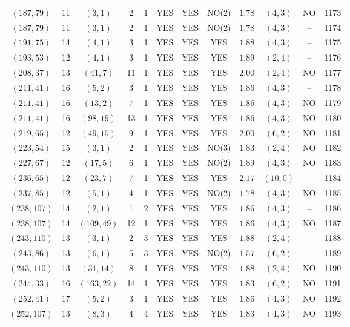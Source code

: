 \begin{longtable}{|c|c|c|c|c|c|c|c|c|c|c|c|}
$(187,79)$ & 11 & $(3,1)$ & 2 & 1 & YES & YES & NO(2) & $1.78$ & $(4,3)$ & NO & 1173\\
$(187,79)$ & 11 & $(3,1)$ & 2 & 1 & YES & YES & NO(2) & $1.78$ & $(4,3)$ & -- & 1174\\
$(191,75)$ & 14 & $(4,1)$ & 3 & 1 & YES & YES & YES & $1.88$ & $(4,3)$ & -- & 1175\\
$(193,53)$ & 12 & $(4,1)$ & 3 & 1 & YES & YES & YES & $1.89$ & $(2,4)$ & -- & 1176\\
$(208,37)$ & 13 & $(41,7)$ & 11 & 1 & YES & YES & YES & $2.00$ & $(2,4)$ & NO & 1177\\
$(211,41)$ & 16 & $(5,2)$ & 3 & 1 & YES & YES & YES & $1.86$ & $(4,3)$ & -- & 1178\\
$(211,41)$ & 16 & $(13,2)$ & 7 & 1 & YES & YES & YES & $1.86$ & $(4,3)$ & NO & 1179\\
$(211,41)$ & 16 & $(98,19)$ & 13 & 1 & YES & YES & YES & $1.86$ & $(4,3)$ & NO & 1180\\
$(219,65)$ & 12 & $(49,15)$ & 9 & 1 & YES & YES & YES & $2.00$ & $(6,2)$ & NO & 1181\\
$(223,54)$ & 15 & $(3,1)$ & 2 & 1 & YES & YES & NO(3) & $1.83$ & $(2,4)$ & NO & 1182\\
$(227,67)$ & 12 & $(17,5)$ & 6 & 1 & YES & YES & NO(2) & $1.89$ & $(4,3)$ & NO & 1183\\
$(236,65)$ & 12 & $(23,7)$ & 7 & 1 & YES & YES & YES & $2.17$ & $(10,0)$ & -- & 1184\\
$(237,85)$ & 12 & $(5,1)$ & 4 & 1 & YES & YES & NO(2) & $1.78$ & $(4,3)$ & NO & 1185\\
$(238,107)$ & 14 & $(2,1)$ & 1 & 2 & YES & YES & YES & $1.86$ & $(4,3)$ & -- & 1186\\
$(238,107)$ & 14 & $(109,49)$ & 12 & 1 & YES & YES & YES & $1.86$ & $(4,3)$ & NO & 1187\\
$(243,110)$ & 13 & $(3,1)$ & 2 & 3 & YES & YES & YES & $1.88$ & $(2,4)$ & -- & 1188\\
$(243,86)$ & 13 & $(6,1)$ & 5 & 3 & YES & YES & NO(2) & $1.57$ & $(6,2)$ & -- & 1189\\
$(243,110)$ & 13 & $(31,14)$ & 8 & 1 & YES & YES & YES & $1.88$ & $(2,4)$ & NO & 1190\\
$(244,33)$ & 16 & $(163,22)$ & 14 & 1 & YES & YES & YES & $1.83$ & $(6,2)$ & NO & 1191\\
$(252,41)$ & 17 & $(5,2)$ & 3 & 1 & YES & YES & YES & $1.86$ & $(4,3)$ & NO & 1192\\
$(252,107)$ & 13 & $(8,3)$ & 4 & 4 & YES & YES & YES & $1.83$ & $(4,3)$ & NO & 1193\\

\end{longtable}
